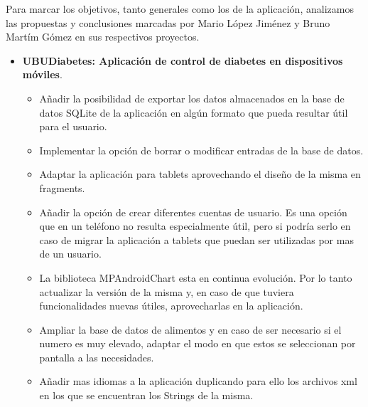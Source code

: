 
Para marcar los objetivos, tanto generales como los de la aplicación, analizamos las propuestas y conclusiones marcadas por Mario López Jiménez y Bruno Martím Gómez en sus respectivos proyectos.

\begin{itemize}
	\item  \textbf{UBUDiabetes: Aplicación de control de diabetes en dispositivos móviles}\cite{mario2016}.
	\begin{itemize}
		\item Añadir la posibilidad de exportar los datos almacenados en la base de datos SQLite de la aplicación en algún 			formato que pueda resultar útil para el usuario.
	\item Implementar la opción de borrar o modificar entradas de la base de datos.
	\item Adaptar la aplicación para tablets aprovechando el diseño de la misma en fragments.
	\item Añadir la opción de crear diferentes cuentas de usuario. Es una opción que en un teléfono no resulta especialmente 		útil, pero si podría serlo en caso de migrar la aplicación a tablets que puedan ser utilizadas por mas de un usuario.
	\item La biblioteca MPAndroidChart esta en continua evolución. Por lo tanto actualizar la versión de la misma y, en caso 		de que tuviera funcionalidades nuevas útiles, aprovecharlas en la aplicación.
	\item Ampliar la base de datos de alimentos y en caso de ser necesario si el numero es muy elevado, adaptar el modo en que 	estos se seleccionan por pantalla a las necesidades.
	\item Añadir mas idiomas a la aplicación duplicando para ello los archivos xml en los que se encuentran los Strings de la 		misma.
	\end{itemize}
	

\end{itemize}
